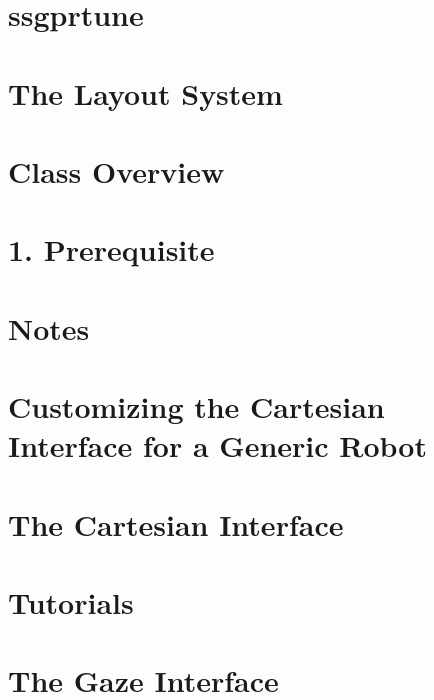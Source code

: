 \let\mypdfximage\pdfximage\def\pdfximage{\immediate\mypdfximage}\documentclass[twoside]{book}
\newcommand{\+}{\discretionary{\mbox{\scriptsize$\hookleftarrow$}}{}{}}
\begin{document}
\chapter{ssgprtune}
\label{md_icub_main_src_modules_learningMachine_scripts_README}

\chapter{The Layout System}
\label{thelayoutsystem}

\chapter{Class Overview}
\label{classoverview}

\chapter{1. Prerequisite}
\label{md_icub_main_src_unittest_README}

\chapter{Notes}
\label{md_icub_main_app_skinGui_conf_positions_README}

\chapter{Customizing the Cartesian Interface for a Generic Robot}
\label{icub_anyrobot_cartesian_interface}

\chapter{The Cartesian Interface}
\label{icub_cartesian_interface}

\chapter{Tutorials}
\label{icub_tutorials}

\chapter{The Gaze Interface}
\label{icub_gaze_interface}

\end{document}
